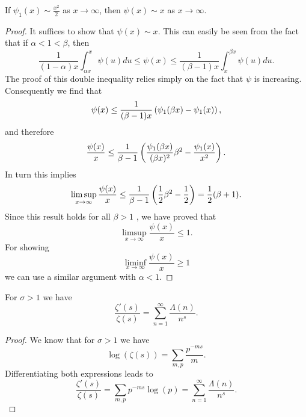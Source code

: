 \begin{lemma}
	If $\psi_1(x) \sim \frac{x^2}{2}$ as $x \to \infty$, then $\psi(x) \sim x$ as $x \to \infty$.
\end{lemma}
\begin{proof}
	It suffices to show that $\psi(x) \sim x$. This can easily be seen from the fact that if $\alpha < 1 < \beta$, then
\begin{equation*}
	\frac{1}{(1 - \alpha) x} \int _{\alpha x} ^x \psi(u) du \leq \psi(x) \leq \frac{1}{(\beta - 1) x} \int _{x} ^{\beta x} \psi(u) du.
\end{equation*}
	The proof of this double inequality relies simply on the fact that $\psi$ is increasing. Consequently we find that
\begin{equation*}
	\psi(x) \leq \frac{1}{(\beta - 1)x} \left(\psi_1(\beta x) - \psi_1(x)\right),
\end{equation*}
	and therefore
\begin{equation*}
	\frac{\psi(x)}{x} \leq \frac{1}{\beta - 1} \left(\frac{\psi_1(\beta x)}{(\beta x)^2} \beta^2 - \frac{\psi_1(x)}{x^2}\right).
\end{equation*}
	In turn this implies
\begin{equation*}
	\limsup _{x \to \infty} \frac{\psi(x)}{x} \leq \frac{1}{\beta - 1} \left(\frac{1}{2} \beta^2 - \frac{1}{2}\right) = \frac{1}{2} (\beta + 1).
\end{equation*}
	Since this result holds for all $\beta > 1$ , we have proved that
\begin{equation*}
	\limsup _{x \to \infty} \frac{\psi(x)}{x} \leq 1. 
\end{equation*}
	For showing
\begin{equation*}
	\liminf _{x \to \infty} \frac{\psi(x)}{x} \geq 1
\end{equation*}
	we can use a similar argument with $\alpha < 1$.
\end{proof}


\begin{lemma}
	For $\sigma > 1$ we have
\begin{equation*}
	\frac{\zeta'(s)}{\zeta(s)} = \sum _{n = 1} ^\infty \frac{\Lambda(n)}{n^s}.
\end{equation*}
\end{lemma}
\begin{proof}
	We know that for $\sigma > 1$ we have
\begin{equation*}
	\log(\zeta(s)) = \sum _{m,p} \frac{p^{-ms}}{m}.
\end{equation*}
	Differentiating both expressions leads to
\begin{equation*}
	\frac{\zeta'(s)}{\zeta(s)} = \sum _{m,p} p^{-ms} \log(p) = \sum _{n = 1} ^\infty \frac{\Lambda(n)}{n^s}.
\end{equation*}
\end{proof}


